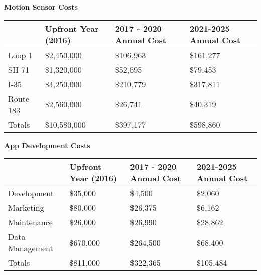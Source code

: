 \documentclass[7pt]{article}
\begin{document}
\center \textbf{Motion Sensor Costs} \\ 
\begin{center}
	\begin{tabular}{ | l | l | l | l |}	\hline
    & Upfront Year (2016) & 2017 - 2020 Annual Cost & 2021-2025 Annual Cost \\ \hline
    Loop 1 & \$2,450,000& \$106,963 & \$161,277 \\ \hline
    SH 71 & \$1,320,000 & \$52,695 & \$79,453 \\ \hline
    I-35 & \$4,250,000 & \$210,779 & \$317,811 \\ \hline
    Route 183 & \$2,560,000 & \$26,741 & \$40,319 \\ \hline 
    Totals & \$10,580,000 & \$397,177 & \$598,860 \\ \hline
	\end{tabular}

\end{center}

\center \textbf{App Development Costs} \\
\begin{center}
	\begin{tabular}{ | l | l | l | l |}	\hline
    & Upfront Year (2016) & 2017 - 2020 Annual Cost & 2021-2025 Annual Cost \\ \hline
    Development & \$35,000 & \$4,500& \$2,060\\ \hline
    Marketing & \$80,000 & \$26,375 & \$6,162 \\ \hline
    Maintenance & \$26,000 & \$26,990 & \$28,862 \\ \hline
    Data Management & \$670,000 & \$264,500 & \$68,400 \\ \hline 
    Totals & \$811,000 & \$322,365 & \$105,484 \\ \hline
	\end{tabular}
\end{center}
\end{document}
